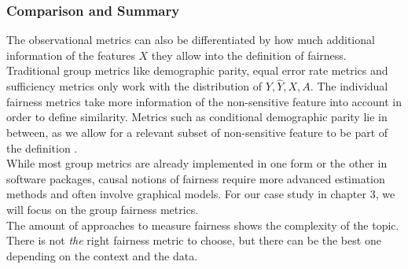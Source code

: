 

\subsubsection*{Comparison and Summary}

The observational metrics can also be differentiated by how much additional information of the features $X$ they allow into the definition of fairness.
Traditional group metrics like demographic parity, equal error rate metrics and sufficiency metrics only work with the distribution of $Y, \hat{Y}, X, A$. The individual fairness metrics take more information of the non-sensitive feature into account in order to define similarity. Metrics such as conditional demographic parity lie in between, as we allow for a relevant subset of non-sensitive feature to be part of the definition \cite{castelnovo2022}.\\
While most group metrics are already implemented in one form or the other in software packages, causal notions of fairness require more advanced estimation methods and often involve graphical models. For our case study in chapter 3, we will focus on the group fairness metrics.\\
The amount of approaches to measure fairness shows the complexity of the topic. There is not \textit{the} right fairness metric to choose, but there can be the best one depending on the context and the data.



